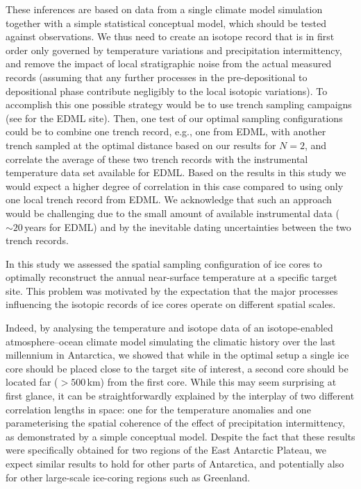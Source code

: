 \documentclass[cp, manuscript]{copernicus}
\begin{document}
These inferences are based on data from a single climate model simulation
together with a simple statistical conceptual model, which should be tested
against observations. We thus need to create an isotope record that is in first
order only governed by temperature variations and precipitation intermittency,
and remove the impact of local stratigraphic noise from the actual measured
records (assuming that any further processes in the pre-depositional to
depositional phase contribute negligibly to the local isotopic variations). To
accomplish this one possible strategy would be to use trench sampling campaigns
(see \citealp{Munch2016,Munch2017} for the EDML site). Then, one test of our
optimal sampling configurations could be to combine one trench record, e.g., one
from EDML, with another trench sampled at the optimal distance based on our
results for $N=2$, and correlate the average of these two trench records with
the instrumental temperature data set available for EDML. Based on the results
in this study we would expect a higher degree of correlation in this case
compared to using only one local trench record from EDML. We acknowledge that
such an approach would be challenging due to the small amount of available
instrumental data ($\sim20$\,years for EDML) and by the inevitable dating
uncertainties between the two trench records.

\conclusions

In this study we assessed the spatial sampling configuration of ice cores to
optimally reconstruct the annual near-surface temperature at a specific target
site. This problem was motivated by the expectation that the major processes
influencing the isotopic records of ice cores operate on different spatial
scales.

Indeed, by analysing the temperature and isotope data of an isotope-enabled
atmosphere--ocean climate model simulating the climatic history over the last
millennium in Antarctica, we showed that while in the optimal setup a single ice
core should be placed close to the target site of interest, a second core should
be located far ($>500$\,km) from the first core. While this may seem surprising
at first glance, it can be straightforwardly explained by the interplay of two
different correlation lengths in space: one for the temperature anomalies and
one parameterising the spatial coherence of the effect of precipitation
intermittency, as demonstrated by a simple conceptual model. Despite the fact
that these results were specifically obtained for two regions of the East
Antarctic Plateau, we expect similar results to hold for other parts of
Antarctica, and potentially also for other large-scale ice-coring regions such
as Greenland.
\end{document}
